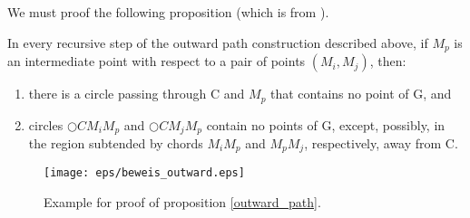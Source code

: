 We must proof the following proposition (which is from \cite{kanj}).

\begin{prop}
\label{outward_path}
In every recursive step of the outward path construction described above, if $M_p $ is an intermediate point with respect to a pair of points $(M_i, M_j) $, then:
\begin{enumerate}
\item there is a circle passing through C and $M_p $ that contains no point of G, and
\item circles $\bigcirc{CM_iM_p} $ and $\bigcirc{CM_jM_p} $ contain no points of G, except, possibly, in the region subtended by chords $M_iM_p $ and $M_pM_j $, respectively, away from C.
\end{enumerate}
\end{prop}

\begin{figure}[h!]
\centering
\texttt{[image: eps/beweis\_outward.eps]}
\caption{Example for proof of proposition \ref{outward_path}.}
\label{fig:outward_path_beweis}
\end{figure}

